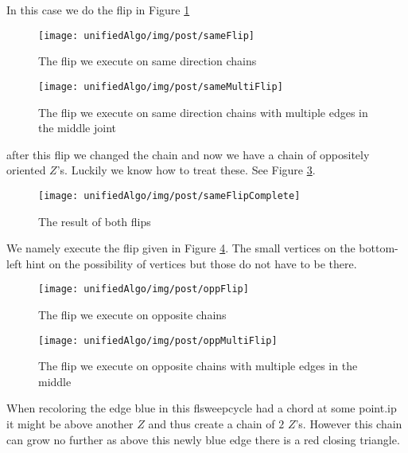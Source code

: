   In this case we do the flip in Figure \ref{fig:uni:sameFlip}

  \begin{figure}[h]
    \centering
    \texttt{[image: unifiedAlgo/img/post/sameFlip]}
    \caption{The flip we execute on same direction chains}
    \label{fig:uni:sameFlip}
  \end{figure}

  \begin{figure}[h]
    \centering
    \texttt{[image: unifiedAlgo/img/post/sameMultiFlip]}
    \caption{The flip we execute on same direction chains with multiple edges in the middle joint}
    \label{fig:uni:sameMultiFlip}
  \end{figure}

   after this flip we changed the chain and now we have a chain of oppositely oriented $Z$'s. Luckily we know how to treat these. See Figure \ref{fig:uni:sameFlipComplete}.

   \begin{figure}[h]
     \centering
     \texttt{[image: unifiedAlgo/img/post/sameFlipComplete]}
     \caption{The result of both flips}
     \label{fig:uni:sameFlipComplete}
   \end{figure}



   We namely execute the flip given in Figure \ref{fig:uni:oppFlip}. The small vertices on the bottom-left hint on the possibility of vertices but those do not have to be there.

  \begin{figure}[h]
    \centering
    \texttt{[image: unifiedAlgo/img/post/oppFlip]}
    \caption{The flip we execute on opposite chains}
    \label{fig:uni:oppFlip}
  \end{figure}

  \begin{figure}[h]
    \centering
    \texttt{[image: unifiedAlgo/img/post/oppMultiFlip]}
    \caption{The flip we execute on opposite chains with multiple edges in the middle}
    \label{fig:uni:oppMultiFlip}
  \end{figure}

  When recoloring the edge blue in this flsweepcycle had a chord at some point.ip it might be above another $Z$ and thus create a chain of $2$ $Z$'s. However this chain can grow no further as above this newly blue edge there is a red closing triangle.

